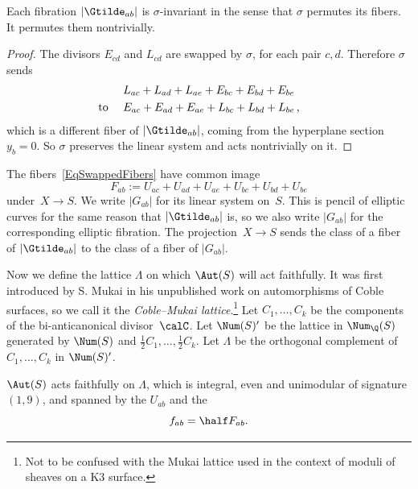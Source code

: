 \begin{lemm}\label{LemFibrationCremonaInvariant}
Each fibration $|\Gtilde_{ab}|$ is $\sigma$-invariant in the sense that $\sigma$ permutes its fibers. It permutes them nontrivially.
\end{lemm}

\begin{proof}
The divisors $E_{cd}$ and $L_{cd}$ are swapped by $\sigma$, for each pair $c,d$. Therefore $\sigma$ sends
\begin{equation}\label{EqSwappedFibers}
\begin{split}
L_{ac}+L_{ad}+L_{ae}+E_{bc}+E_{bd}+E_{be}
\\
\llap{\text{to} \quad}E_{ac}+E_{ad}+E_{ae}+L_{bc}+L_{bd}+L_{be}\rlap{\,,}
\end{split}
\end{equation}
which is a different fiber of $|\Gtilde_{ab}|$, coming from the hyperplane section $y_b=0$. So $\sigma$ preserves the linear system and acts nontrivially on it.
\end{proof}

The fibers~\eqref{EqSwappedFibers} have common image
\begin{equation*}
F_{ab}:= U_{ac}+U_{ad}+U_{ae}+U_{bc}+U_{bd}+U_{be}
\end{equation*}
under~$X\to S$. We write $|G_{ab}|$ for its linear system on~$S$. This is pencil of elliptic curves for the same reason that $|\Gtilde_{ab}|$ is, so we also write $|G_{ab}|$ for the corresponding elliptic fibration. The projection~$X\to S$ sends the class of a fiber of $|\Gtilde_{ab}|$ to the class of a fiber of $|G_{ab}|$.

Now we define the lattice $\Lambda$ on which $\Aut(S)$ will act faithfully. It was first introduced by S. Mukai in his unpublished work on automorphisms of Coble surfaces, so we call it the \emph{Coble--Mukai lattice}.\footnote{Not to be confused with the Mukai lattice used in the context of moduli of sheaves on a K3 surface.} Let $C_1,\dots,C_k$ be the components of the bi-anticanonical divisor~$\calC$. Let $\Num(S)'$ be the lattice in $\Num_\Q(S)$ generated by $\Num(S)$ and $\frac12C_1,\dots,\frac12C_k$. Let $\Lambda$ be the orthogonal complement of $C_1,\dots,C_k$ in $\Num(S)'$.

\begin{lemm}\label{LemFaithful}
$\Aut(S)$ acts faithfully on $\Lambda$, which is integral, even and unimodular of signature $(1,9)$, and spanned by the $U_{ab}$ and the
\begin{equation}\label{Eqfab}
\textstyle f_{ab}=\half F_{ab}.
\end{equation}
\end{lemm}

